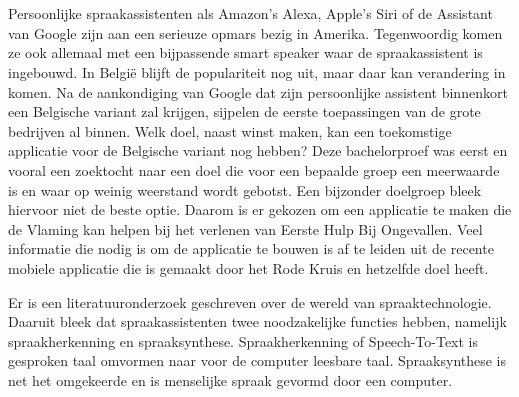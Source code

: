 


\chapter*{}
Persoonlijke spraakassistenten als Amazon's Alexa, Apple's Siri of de Assistant van Google zijn aan een serieuze opmars bezig in Amerika. Tegenwoordig komen ze ook allemaal met een bijpassende smart speaker waar de spraakassistent is ingebouwd. In België blijft de populariteit nog uit, maar daar kan verandering in komen. Na de aankondiging van Google dat zijn persoonlijke assistent binnenkort een Belgische variant zal krijgen, sijpelen de eerste toepassingen van de grote bedrijven al binnen. Welk doel, naast winst maken, kan een toekomstige applicatie voor de Belgische variant nog hebben? Deze bachelorproef was eerst en vooral een zoektocht naar een doel die voor een bepaalde groep een meerwaarde is en waar op weinig weerstand wordt gebotst. Een bijzonder doelgroep bleek hiervoor niet de beste optie. Daarom is er gekozen om een applicatie te maken die de Vlaming kan helpen bij het verlenen van Eerste Hulp Bij Ongevallen. Veel informatie die nodig is om de applicatie te bouwen is af te leiden uit de recente mobiele applicatie die is gemaakt door het Rode Kruis en hetzelfde doel heeft.

Er is een literatuuronderzoek geschreven over de wereld van spraaktechnologie. Daaruit bleek dat spraakassistenten twee noodzakelijke functies hebben, namelijk spraakherkenning en spraaksynthese. Spraakherkenning of Speech-To-Text is gesproken taal omvormen naar voor de computer leesbare taal. Spraaksynthese is net het omgekeerde en is menselijke spraak gevormd door een computer.

